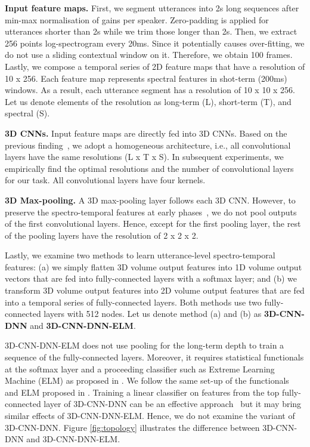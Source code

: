 \documentclass[conference, compsoc, twoside]{IEEEtran}
\begin{document}
\textbf{Input feature maps.} First, we segment utterances into 2s long sequences after min-max normalisation of gains per speaker. Zero-padding is applied for utterances shorter than 2s while we trim those longer than 2s. Then, we extract 256 points log-spectrogram every 20ms. Since it potentially causes over-fitting, we do not use a sliding contextual window on it. Therefore, we obtain 100 frames. Lastly, we compose a temporal series of 2D feature maps that have a resolution of 10 x 256. Each feature map represents spectral features in shot-term (200ms) windows. As a result, each utterance segment has a resolution of 10 x 10 x 256. Let us denote elements of the resolution as long-term (L), short-term (T), and spectral (S).

\textbf{3D CNNs.} Input feature maps are directly fed into 3D CNNs. Based on the previous finding~\cite{tran2015learning}, we adopt a homogeneous architecture, i.e., all convolutional layers have the same resolutions (L x T x S). In subsequent experiments, we empirically find the optimal resolutions and the number of convolutional layers for our task. All convolutional layers have four kernels.

\textbf{3D Max-pooling.} A 3D max-pooling layer follows each 3D CNN. However, to preserve the spectro-temporal features at early phases~\cite{tran2015learning}, we do not pool outputs of the first convolutional layers. Hence, except for the first pooling layer, the rest of the pooling layers have the resolution of 2 x 2 x 2. 

Lastly, we examine two methods to learn utterance-level spectro-temporal features: (a) we simply flatten 3D volume output features into 1D volume output vectors that are fed into fully-connected layers with a softmax layer; and (b) we transform 3D volume output features into 2D volume output features that are fed into a temporal series of fully-connected layers. Both methods use two fully-connected layers with 512 nodes. Let us denote method (a) and (b) as \textbf{3D-CNN-DNN} and \textbf{3D-CNN-DNN-ELM}.

3D-CNN-DNN-ELM does not use pooling for the long-term depth to train a sequence of the fully-connected layers. Moreover, it requires statistical functionals at the softmax layer and a proceeding classifier such as Extreme Learning Machine (ELM) as proposed in \cite{kunHan2014dnn,lee2015high}. We follow the same set-up of the functionals and ELM proposed in \cite{kunHan2014dnn,lee2015high}. Training a linear classifier on features from the top fully-connected layer of 3D-CNN-DNN can be an effective approach~\cite{tran2015learning} but it may bring similar effects of 3D-CNN-DNN-ELM. Hence, we do not examine the variant of 3D-CNN-DNN. Figure \ref{fig:topology} illustrates the difference between 3D-CNN-DNN and 3D-CNN-DNN-ELM. 
\end{document}
